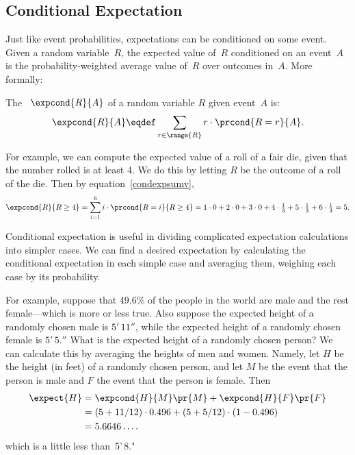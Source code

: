 \subsection{Conditional Expectation}

Just like event probabilities, expectations can be conditioned on some
event.  Given a random variable~$R$, the expected value of~$R$
conditioned on an event~$A$ is the probability-weighted average value
of~$R$ over outcomes in~$A$.  More formally:
\begin{definition}\label{condexpdef} %
The ~$\expcond{R}{A}$ of a random
variable $R$ given event~$A$ is:
\begin{equation}\label{condexpsumv}
\expcond{R}{A} \eqdef \sum_{r \in \range{R}} r \cdot\prcond{R=r}{A}.
\end{equation}
\end{definition}
\iffalse
In other words, it is the average value of the variable $R$ when values
are weighted by their conditional probabilities given $A$.
\fi

For example, we can compute the expected value of a roll of a fair
die, given that the number rolled is at least 4.  We do this by
letting $R$ be the outcome of a roll of the die.  Then by
equation~\eqref{condexpsumv},
\[
\expcond{R}{R \geq 4} = \sum_{i=1}^6 i \cdot \prcond{R=i}{R \ge 4}
= 1\cdot 0 + 2\cdot 0 + 3\cdot 0 +
  4\cdot\tfrac{1}{3} + 5\cdot\tfrac{1}{3} + 6\cdot\tfrac{1}{3}
= 5.
\]

Conditional expectation is useful in dividing complicated expectation
calculations into simpler cases.  We can find a desired expectation
by calculating the conditional expectation in each simple case and
averaging them, weighing each case by its probability.

For example, suppose that 49.6\% of the people in the world are male and
the rest female---which is more or less true.  Also suppose the expected
height of a randomly chosen male is $5'\,11''$, while the expected height
of a randomly chosen female is $5'\,5.''$  What is the expected height of a
randomly chosen person?  We can calculate this by averaging the
heights of men and women.  Namely, let $H$ be the height (in feet) of a
randomly chosen person, and let $M$ be the event that the person is male
and $F$ the event that the person is female.  Then
\begin{align*}
\expect{H} &= \expcond{H}{M} \pr{M} + \expcond{H}{F} \pr{F}\\
&= (5 + 11/12) \cdot 0.496  + (5 + 5/12) \cdot (1 - 0.496)\\
&= 5.6646\dots.
\end{align*}
which is a little less than~5'\,8."


